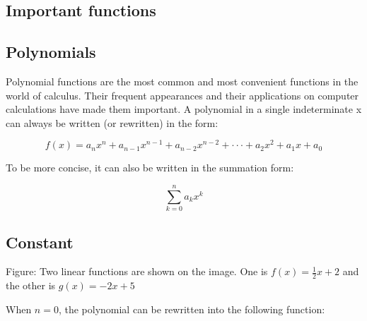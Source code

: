 \subsection{Important functions}
\label{sss:impo-1cf2}





\subsection{Polynomials}
\label{sss:poly-f9e4}




Polynomial functions are the most common and most convenient functions in the world of
calculus. Their frequent appearances and their applications on computer calculations have
made them important. A polynomial in a single indeterminate x can always be written (or
rewritten) in the form:



$$f(x)=a _n x^n+a _{n-1}x^{n-1}+a _{n-2}x^{n-2}+\cdot\cdot\cdot+a _2x^2+a _1x+a _0$$



To be more concise, it can also be written in the summation form:



$$\sum _{k=0}^n a _k x^k$$




\subsection{Constant}
\label{sss:cons-617a}







Figure: Two linear functions are shown on the image. One is $f(x)=\frac{1}{2}x+2$ and the
other is $g(x)=-2x+5$



When $n=0$, the polynomial can be rewritten into the following function:



